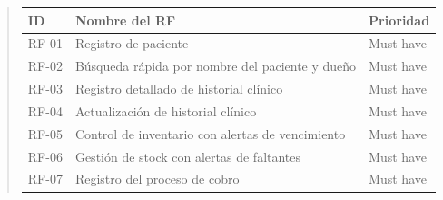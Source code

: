 \documentclass[
]{article}
\newcounter{none} %
\begin{document}
\begin{quote}
{\def\LTcaptype{none} %
\begin{longtable}[]{|
  >{\raggedleft\arraybackslash}p{}|
  >{\raggedright\arraybackslash}p{}|
  >{\raggedright\arraybackslash}p{}|}
\hline
\begin{minipage}[b]{\linewidth}\raggedleft
\textbf{ID}
\end{minipage} & \begin{minipage}[b]{\linewidth}\centering
\textbf{Nombre del RF}
\end{minipage} & \begin{minipage}[b]{\linewidth}\centering
\textbf{Prioridad}
\end{minipage} \\
\hline
\endhead
\hline
\endlastfoot
RF-01 & Registro de paciente &
\begin{minipage}[t]{\linewidth}\raggedright
Must have
\end{minipage} \\
\hline
RF-02 & Búsqueda rápida por nombre del paciente y dueño &
\begin{minipage}[t]{\linewidth}\raggedright
Must have
\end{minipage} \\
\hline
RF-03 & Registro detallado de historial clínico &
\begin{minipage}[t]{\linewidth}\raggedright
Must have
\end{minipage} \\
\hline
RF-04 & Actualización de historial clínico &
\begin{minipage}[t]{\linewidth}\raggedright
Must have
\end{minipage} \\
\hline
RF-05 & Control de inventario con alertas de vencimiento &
\begin{minipage}[t]{\linewidth}\raggedright
Must have
\end{minipage} \\
\hline
RF-06 & Gestión de stock con alertas de faltantes &
\begin{minipage}[t]{\linewidth}\raggedright
Must have
\end{minipage} \\
\hline
RF-07 & Registro del proceso de cobro &
\begin{minipage}[t]{\linewidth}\raggedright
Must have
\end{minipage} \\

\end{longtable}}
\end{quote}
\end{document}
